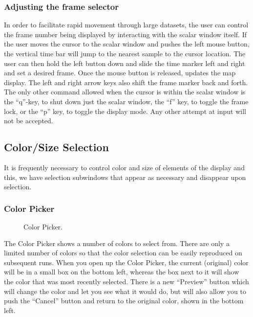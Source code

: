
\subsubsection{Adjusting the frame selector}
\label{sec:control-frames} 

In order to facilitate rapid movement through large datasets, the user can
control the frame number being displayed by interacting with the scalar
window itself.  If the user moves the cursor to the scalar window and
pushes the left mouse button, the vertical time bar will jump to the
nearest sample to the cursor location.  The user can then hold the left
button down and slide the time marker left and right and set a desired
frame.  Once the mouse button is released,\map{} updates the map display.
The left and right arrow keys also shift the frame marker back and forth.
The only other command allowed when the cursor is within the scalar window
is the ``q''-key, to shut down just the scalar window, the ``f'' key,
to toggle the frame lock, or the ``p'' key, to toggle the display mode.
Any other attempt at input will not be accepted.



\subsection{Color/Size Selection}
\label{sec:control-color} 

It is frequently necessary to control color and size of elements of the
\map{} display and this, we have selection subwindows that appear as
necessary and disappear upon selection.


\subsubsection{Color Picker}

\begin{figure}[htb]
  \begin{makeimage}
  \end{makeimage}
  \caption{\label{fig:colorpicker1} Color Picker.}
\end{figure}


The Color Picker shows a number of colors to select from.  There are only a
limited number of colors so that the color selection can be easily
reproduced on subsequent runs.  When you open up the Color Picker, the
current (original) color will be in a small box on the bottom left, whereas
the box next to it will show the color that was most recently selected.
There is a new ``Preview'' button which will change the color and let you
see what it would do, but will also allow you to push the ``Cancel'' button
and return to the original color, shown in the bottom left.

